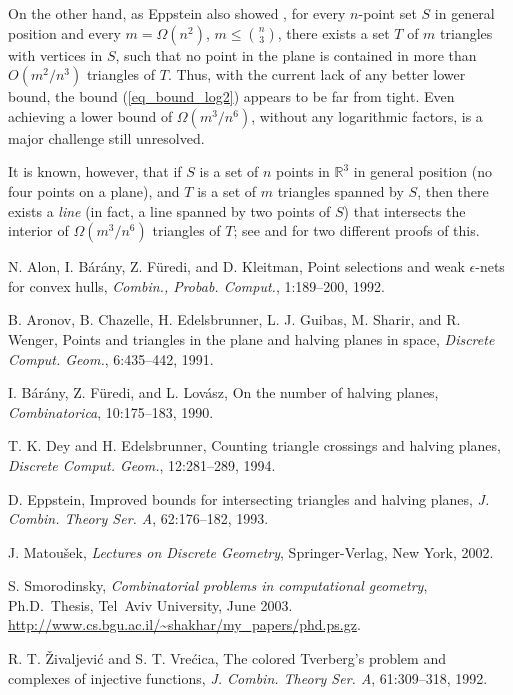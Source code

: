 \documentclass[11pt]{article}
\begin{document}
On the other hand, as Eppstein also showed \cite{eppstein}, for
every $n$-point set $S$ in general position and every $m =
\Omega(n^2)$, $m\le {n\choose 3}$, there exists a set $T$ of $m$
triangles with vertices in $S$, such that no point in the plane is
contained in more than $O(m^2/n^3)$ triangles of $T$. Thus, with the
current lack of any better lower bound, the bound
(\ref{eq_bound_log2}) appears to be far from tight. Even achieving a
lower bound of $\Omega(m^3/n^6)$, without any logarithmic factors,
is a major challenge still unresolved.

It is known, however, that if $S$ is a set of $n$ points in $\mathbb
R^3$ in general position (no four points on a plane), and $T$ is a
set of $m$ triangles spanned by $S$, then there exists a \emph{line}
(in fact, a line spanned by two points of $S$) that intersects the
interior of $\Omega(m^3/n^6)$ triangles of $T$; see \cite{DE} and
\cite{smo_phd} for two different proofs of this.

\begin{thebibliography}{9}

N. Alon, I. B\'ar\'any, Z. F\"uredi, and D. Kleitman, Point
selections and weak $\epsilon$-nets for convex hulls, \emph{Combin.,
Probab. Comput.}, 1:189--200, 1992.

B. Aronov, B. Chazelle, H. Edelsbrunner, L. J. Guibas, M. Sharir,
and R. Wenger, Points and triangles in the plane and halving planes
in space, \emph{Discrete Comput. Geom.}, 6:435--442, 1991.

I. B\'ar\'any, Z. F\"uredi, and L. Lov\'asz, On the number of
halving planes, \emph{Combinatorica}, 10:175--183, 1990.

T. K. Dey and H. Edelsbrunner, Counting triangle crossings and
halving planes, \emph{Discrete Comput. Geom.}, 12:281--289, 1994.

 D. Eppstein, Improved bounds for intersecting
triangles and halving planes, \emph{J. Combin. Theory Ser. A},
62:176--182, 1993.

J. Matou\v sek, \emph{Lectures on Discrete Geometry},
Springer-Verlag, New York, 2002.

S. Smorodinsky, \emph{Combinatorial problems in computational
geometry}, Ph.D.~Thesis, Tel~Aviv University, June 2003.
\url{http://www.cs.bgu.ac.il/~shakhar/my_papers/phd.ps.gz}.

R. T. \v Zivaljevi\'c and S. T. Vre\'cica, The colored Tverberg's
problem and complexes of injective functions, \emph{J. Combin.
Theory Ser. A}, 61:309--318, 1992.

\end{thebibliography}
\end{document}
